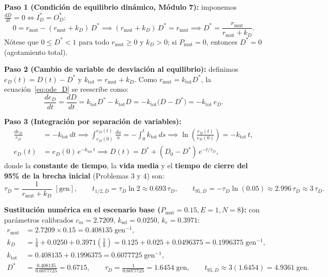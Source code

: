 \documentclass[11pt,a4paper]{article}
\begin{document}
\textbf{Paso 1 (Condici\'on de equilibrio din\'amico, M\'odulo 7):} imponemos $\frac{dD}{dt} = 0 \iff I_D^* = O_D^*$:
\begin{equation}
0 = r_{\text{mut}} - (r_{\text{mut}} + k_D)\,D^* \implies
(r_{\text{mut}} + k_D)\,D^* = r_{\text{mut}} \implies
D^* = \frac{r_{\text{mut}}}{r_{\text{mut}} + k_D}.
\label{eq:D_star}
\end{equation}
N\'otese que $0 \le D^* < 1$ para todo $r_{\text{mut}} \ge 0$ y $k_D > 0$; si $P_{\text{mut}} = 0$, entonces $D^* = 0$ (agotamiento total).

\textbf{Paso 2 (Cambio de variable de desviaci\'on al equilibrio):} definimos $e_D(t) = D(t) - D^*$ y $k_{\text{tot}} = r_{\text{mut}} + k_D$. Como $r_{\text{mut}} = k_{\text{tot}} D^*$, la ecuaci\'on~\eqref{eq:ode_D} se reescribe como:
\begin{equation}
\frac{de_D}{dt} = \frac{dD}{dt} = k_{\text{tot}} D^* - k_{\text{tot}} D = -k_{\text{tot}}\big(D - D^*\big) = -k_{\text{tot}}\,e_D.
\end{equation}

\textbf{Paso 3 (Integraci\'on por separaci\'on de variables):}
\begin{align}
\frac{de_D}{e_D} &= -k_{\text{tot}}\,dt \implies \int_{e_D(0)}^{e_D(t)} \frac{du}{u} = -\int_{0}^{t} k_{\text{tot}}\,ds \implies
\ln\!\left(\frac{e_D(t)}{e_D(0)}\right) = -k_{\text{tot}}\,t, \\
e_D(t) &= e_D(0)\,e^{-k_{\text{tot}}\,t} \implies
D(t) = D^* + (D_0 - D^*)\,e^{-t/\tau_D},
\label{eq:D_analitica}
\end{align}
donde la \textbf{constante de tiempo}, la \textbf{vida media} y el \textbf{tiempo de cierre del 95\% de la brecha inicial} (Problemas 3 y 4) son:
\begin{equation}
\tau_D = \frac{1}{r_{\text{mut}} + k_D}\;[\text{gen}], \qquad
t_{1/2,D} = \tau_D\ln 2 \approx 0.693\,\tau_D, \qquad
t_{95,D} = -\tau_D\ln(0.05) \approx 2.996\,\tau_D \approx 3\,\tau_D.
\end{equation}

\textbf{Sustituci\'on num\'erica en el escenario base ($P_{\text{mut}}=0.15, E=1, N=8$):} con par\'ametros calibrados $c_m = 2.7209$, $k_{\text{sel}} = 0.0250$, $k_e = 0.3971$:
\begin{align*}
r_{\text{mut}} &= 2.7209 \times 0.15 = 0.408135\;\text{gen}^{-1}, \\
k_D &= \frac{1}{8} + 0.0250 + 0.3971\left(\frac{1}{8}\right) = 0.125 + 0.025 + 0.0496375 = 0.1996375\;\text{gen}^{-1}, \\
k_{\text{tot}} &= 0.408135 + 0.1996375 = 0.6077725\;\text{gen}^{-1}, \\
D^* &= \frac{0.408135}{0.6077725} = 0.6715, \qquad
\tau_D = \frac{1}{0.6077725} = 1.6454\;\text{gen}, \qquad
t_{95,D} \approx 3(1.6454) = 4.9361\;\text{gen}.
\end{align*}
\end{document}
